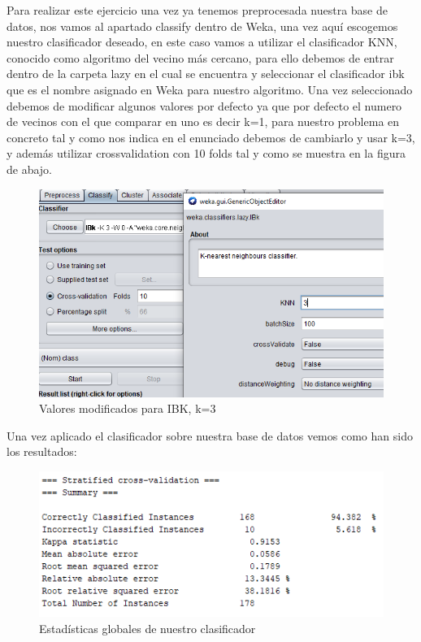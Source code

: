 Para realizar este ejercicio una vez ya tenemos preprocesada nuestra base de datos, nos vamos al apartado classify dentro de Weka, una vez aquí escogemos nuestro clasificador deseado, en este caso vamos a utilizar el clasificador KNN, conocido como algoritmo del vecino más cercano, para ello debemos de entrar dentro de la carpeta lazy en el cual se encuentra y seleccionar el clasificador ibk que es el nombre asignado en Weka para nuestro algoritmo. Una vez seleccionado debemos de modificar algunos valores por defecto ya que por defecto el numero de vecinos con el que comparar en uno es decir k=1, para nuestro problema en concreto tal y como nos indica en el enunciado debemos de cambiarlo y usar k=3, y además utilizar crossvalidation con 10 folds tal y como se muestra en la figura de abajo.

\begin{figure}[H]
    \centering
    \includegraphics[width=\textwidth]{img/IB3.PNG}
    \caption{Valores modificados para IBK, k=3}
\end{figure}

Una vez aplicado el clasificador sobre nuestra base de datos vemos como han sido los resultados:
\begin{figure}[H]
    \centering
    \includegraphics[width=\textwidth]{img/EGlobales.PNG}
    \caption{Estadísticas globales de nuestro clasificador}
\end{figure}

